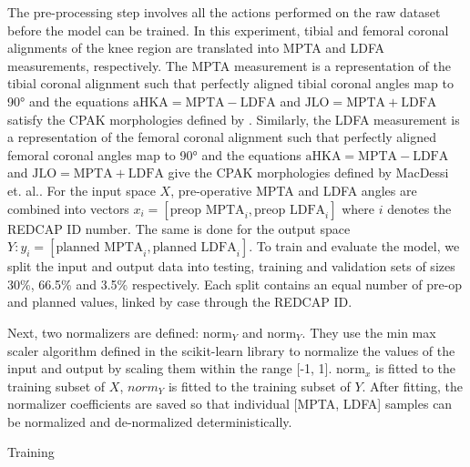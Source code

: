 \documentclass{article}
\begin{document}
	The pre-processing step involves all the actions performed on the raw dataset before the model can be trained.
In this experiment, tibial and femoral coronal alignments of the knee region are translated into MPTA and LDFA measurements, respectively.
The MPTA measurement is a representation of the tibial coronal alignment such that perfectly aligned tibial coronal angles map to 90° 
and the equations $\text{aHKA}=\text{MPTA}-\text{LDFA}$ and $\text{JLO}=\text{MPTA}+\text{LDFA}$ satisfy the CPAK morphologies defined by \cite{cpak-paper}.
Similarly, the LDFA measurement is a representation of the femoral coronal alignment such that perfectly aligned femoral coronal angles map to 90°
and the equations $\text{aHKA}=\text{MPTA}-\text{LDFA}$ and $\text{JLO}=\text{MPTA}+\text{LDFA}$ give the CPAK morphologies defined by MacDessi et. al.\cite{cpak-paper}.
For the input space $X$, pre-operative MPTA and LDFA angles are combined into vectors $x_i=[\text{preop MPTA}_i, \text{preop LDFA}_i]$
where $i$ denotes the REDCAP ID number. The same is done for the output space $Y: y_i=[\text{planned MPTA}_i, \text{planned LDFA}_i]$.
To train and evaluate the model, we split the input and output data into testing, training and validation sets of sizes 30\%, 66.5\% and 3.5\% respectively.
Each split contains an equal number of pre-op and planned values, linked by case through the REDCAP ID.

	Next, two normalizers are defined: $\text{norm}_Y$ and $\text{norm}_Y$.
They use the min max scaler algorithm defined in the scikit-learn library \cite{scikit-learn} to normalize the values of the input and output
by scaling them within the range [-1, 1].
$\text{norm}_x$ is fitted to the training subset of $X$, $norm_Y$ is fitted to the training subset of $Y$.
After fitting, the normalizer coefficients are saved so that individual [MPTA, LDFA] samples can be normalized and de-normalized deterministically.

Training
\end{document}
